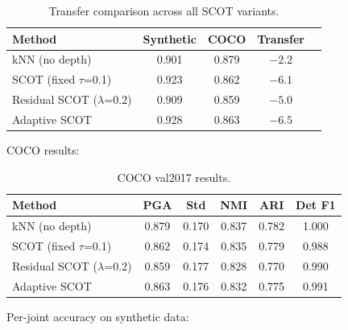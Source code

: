 \begin{table}[H]
\centering
\footnotesize
\begin{tabular}{lcccc}
\toprule
Method & Synthetic & COCO & Transfer \\
\midrule
kNN (no depth) & 0.901 & 0.879 & $-2.2$ \\
SCOT (fixed $\tau$=0.1) & 0.923 & 0.862 & $-6.1$ \\
Residual SCOT ($\lambda$=0.2) & 0.909 & 0.859 & $-5.0$ \\
Adaptive SCOT & 0.928 & 0.863 & $-6.5$ \\
\bottomrule
\end{tabular}
\caption{Transfer comparison across all SCOT variants.}
\end{table}

COCO results:

\begin{table}[H]
\centering
\footnotesize
\begin{tabular}{lccccc}
\toprule
Method & PGA & Std & NMI & ARI & Det F1 \\
\midrule
kNN (no depth) & 0.879 & 0.170 & 0.837 & 0.782 & 1.000 \\
SCOT (fixed $\tau$=0.1) & 0.862 & 0.174 & 0.835 & 0.779 & 0.988 \\
Residual SCOT ($\lambda$=0.2) & 0.859 & 0.177 & 0.828 & 0.770 & 0.990 \\
Adaptive SCOT & 0.863 & 0.176 & 0.832 & 0.775 & 0.991 \\
\bottomrule
\end{tabular}
\caption{COCO val2017 results.}
\end{table}

Per-joint accuracy on synthetic data:

